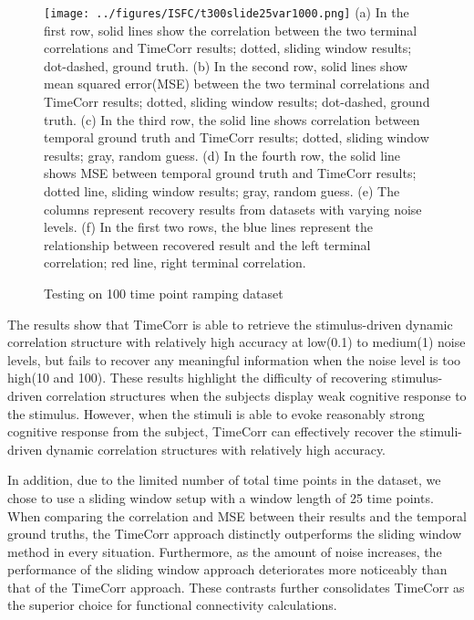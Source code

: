 \documentclass[11pt]{article}
\begin{document}
\begin{figure}[!htb]
\caption{Testing on 100 time point ramping dataset}
\texttt{[image: ../figures/ISFC/t300slide25var1000.png]}
\label{fig:t300slide25var1000}
(a) In the first row, solid lines show the correlation between the two terminal correlations and TimeCorr results; dotted, sliding window results; dot-dashed, ground truth. (b) In the second row, solid lines show mean squared error(MSE) between the two terminal correlations and TimeCorr results; dotted, sliding window results; dot-dashed, ground truth. (c) In the third row, the solid line shows correlation between temporal ground truth and TimeCorr results; dotted, sliding window results; gray, random guess. (d) In the fourth row, the solid line shows MSE between temporal ground truth and TimeCorr results; dotted line, sliding window results; gray, random guess. (e) The columns represent recovery results from datasets with varying noise levels. (f) In the first two rows, the blue lines represent the relationship between recovered result and the left terminal correlation; red line, right terminal correlation.
\end{figure}

The results show that TimeCorr is able to retrieve the stimulus-driven dynamic correlation structure with relatively high accuracy at low(0.1) to medium(1) noise levels, but fails to recover any meaningful information when the noise level is too high(10 and 100). These results highlight the difficulty of recovering stimulus-driven correlation structures when the subjects display weak cognitive response to the stimulus. However, when the stimuli is able to evoke reasonably strong cognitive response from the subject, TimeCorr can effectively recover the stimuli-driven dynamic correlation structures with relatively high accuracy.

In addition, due to the limited number of total time points in the dataset, we chose to use a sliding window setup with a window length of 25 time points. When comparing the correlation and MSE between their results and the temporal ground truths, the TimeCorr approach distinctly outperforms the sliding window method in every situation. Furthermore, as the amount of noise increases, the performance of the sliding window approach deteriorates more noticeably than that of the TimeCorr approach. These contrasts further consolidates TimeCorr as the superior choice for functional connectivity calculations.
\end{document}
